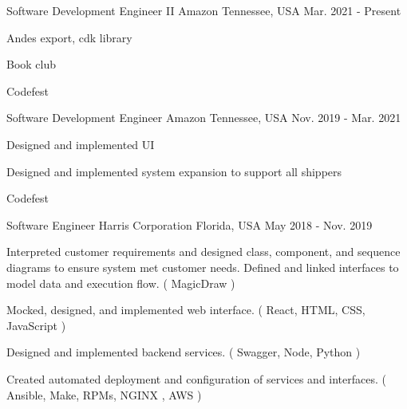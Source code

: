 

\begin{cventries}

  \cventry
    {Software Development Engineer II} %
    {Amazon} %
    {Tennessee, USA} %
    {Mar. 2021 - Present} %
    {
      \begin{cvitems} %
        \item {Andes export, cdk library}
        \item {Book club}
        \item {Codefest}
      \end{cvitems}
    }

  \cventry
    {Software Development Engineer} %
    {Amazon} %
    {Tennessee, USA} %
    {Nov. 2019 - Mar. 2021} %
    {
      \begin{cvitems} %
        \item {Designed and implemented UI}
        \item {Designed and implemented system expansion to support all shippers}
        \item {Codefest}
      \end{cvitems}
    }

  \cventry
    {Software Engineer} %
    {Harris Corporation} %
    {Florida, USA} %
    {May 2018 - Nov. 2019} %
    {
      \begin{cvitems} %
        \item {Interpreted customer requirements and designed class, component, and sequence diagrams to ensure system met customer needs. Defined and linked interfaces to model data and execution flow. ( MagicDraw )}
        \item {Mocked, designed, and implemented web interface. ( React, HTML, CSS, JavaScript )}
        \item {Designed and implemented backend services. ( Swagger, Node, Python )}
        \item {Created automated deployment and configuration of services and interfaces. ( Ansible, Make, RPMs, NGINX , AWS )}
      \end{cvitems}
    }


\end{cventries}

